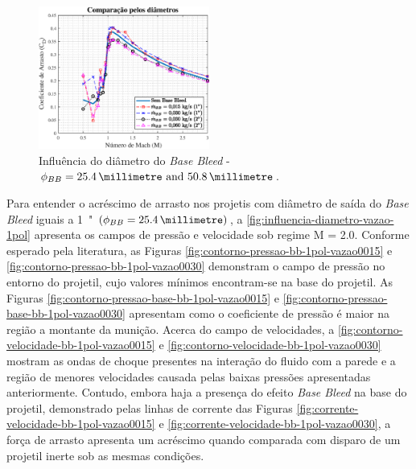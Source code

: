 \begin{figure}[!ht]
	\centering
    \includegraphics[width=0.5\textwidth]{cd-combasebleed-diametro-1e2pol.eps}
	\caption{Influência do diâmetro do \textit{Base Bleed} - \(\phi_{BB} = \qtylist{25,4;50,8}{\millimetre}\).}
	\label{fig:comparacao-bb-diametro-1e2pol}
\end{figure}

Para entender o acréscimo de arrasto nos projetis com diâmetro de saída do \textit{Base Bleed} iguais a \qty{1}{"} \(\left(\phi_{BB} = \qty{25,4}{\millimetre}\right)\), a \autoref{fig:influencia-diametro-vazao-1pol} apresenta os campos de pressão e velocidade sob regime M = \num{2,0}. Conforme esperado pela literatura, as Figuras \ref{fig:contorno-pressao-bb-1pol-vazao0015} e \ref{fig:contorno-pressao-bb-1pol-vazao0030} demonstram o campo de pressão no entorno do projetil, cujo valores mínimos encontram-se na base do projetil. As Figuras \ref{fig:contorno-pressao-base-bb-1pol-vazao0015} e \ref{fig:contorno-pressao-base-bb-1pol-vazao0030} apresentam como o coeficiente de pressão é maior na região a montante da munição. Acerca do campo de velocidades, a \autoref{fig:contorno-velocidade-bb-1pol-vazao0015} e \autoref{fig:contorno-velocidade-bb-1pol-vazao0030} mostram as ondas de choque presentes na interação do fluido com a parede e a região de menores velocidades causada pelas baixas pressões apresentadas anteriormente. Contudo, embora haja a presença do efeito \textit{Base Bleed} na base do projetil, demonstrado pelas linhas de corrente das Figuras \ref{fig:corrente-velocidade-bb-1pol-vazao0015} e \ref{fig:corrente-velocidade-bb-1pol-vazao0030}, a força de arrasto apresenta um acréscimo quando comparada com disparo de um projetil inerte sob as mesmas condições.


